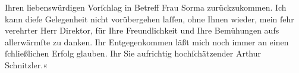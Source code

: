                Ihren liebenswürdigen Vorſchlag in Betreff Frau Sorma zurückzukommen. Ich kann dieſe Gelegenheit nicht vorübergehen laſſen,
               ohne Ihnen wieder, mein ſehr verehrter Herr Direktor, für Ihre Freundlichkeit und
               Ihre Bemühungen aufs allerwärmſte zu danken. Ihr Entgegenkommen läßt mich noch immer
               an einen ſchließlichen Erfolg glauben. Ihr Sie aufrichtig hochſchätzender Arthur
               Schnitzler.«\pend
           \endnumbering{}  
      